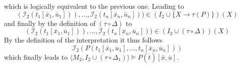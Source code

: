 \documentclass[11pt,a4paper]{article}
\begin{document}
\begin{itemize}[leftmargin=*]
\begin{equation*}
\end{equation*}
which is logically equivalent to the previous one. Leading to 
\begin{equation*}
(\mathcal{I}_2(t_1[\overline{x}_1, \overline{u}_1])), \dots , \mathcal{I}_2(t_n[\overline{x}_n,  \overline{u}_n])) \in  (I_2 \cup \{X \to \tau(P)\})(X)
\end{equation*}
and finally by the definition of $(\tau \circ \Delta)$ to 
\begin{equation*}
(\mathcal{I}_2(t_1[\overline{x}_1, \overline{u}_1])), \dots , \mathcal{I}_2(t_n[\overline{x}_n, \overline{u}_n])) \in  (I_2 \cup (\tau \circ \Delta))(X)
\end{equation*}
By the definition of the interpretation it thus follows 
\begin{equation*}
\mathcal{I}_2(P(t_1[\overline{x}_1,\overline{u}_1], \dots , t_n[\overline{x}_n,\overline{u}_n]))
\end{equation*}
which finally leads to $\langle M_2, I_2 \cup (\tau \circ \Delta_1) \rangle \models  P(\overline{t})[\overline{x}, \overline{u}]$.\\



\end{itemize}
\end{document}
